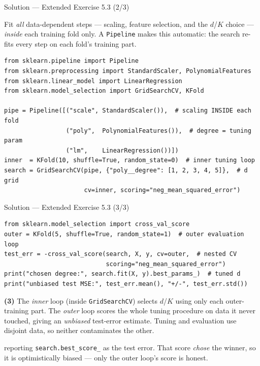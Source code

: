 \documentclass[aspectratio=169,11pt]{beamer}
\begin{document}
\begin{frame}[fragile]{Solution --- Extended Exercise 5.3 (2/3)}
  \begin{solutionbox}
    Fit \emph{all} data-dependent steps --- scaling, feature selection,
    and the $d$/$K$ choice --- \emph{inside} each training fold only. A
    \texttt{Pipeline} makes this automatic: the search re-fits every step
    on each fold's training part.
  \end{solutionbox}
  \begin{lstlisting}
from sklearn.pipeline import Pipeline
from sklearn.preprocessing import StandardScaler, PolynomialFeatures
from sklearn.linear_model import LinearRegression
from sklearn.model_selection import GridSearchCV, KFold

pipe = Pipeline([("scale", StandardScaler()),  # scaling INSIDE each fold
                 ("poly",  PolynomialFeatures()),  # degree = tuning param
                 ("lm",    LinearRegression())])
inner  = KFold(10, shuffle=True, random_state=0)  # inner tuning loop
search = GridSearchCV(pipe, {"poly__degree": [1, 2, 3, 4, 5]},  # d grid
                      cv=inner, scoring="neg_mean_squared_error")
  \end{lstlisting}
\end{frame}

\begin{frame}[fragile]{Solution --- Extended Exercise 5.3 (3/3)}
  \begin{lstlisting}
from sklearn.model_selection import cross_val_score
outer = KFold(5, shuffle=True, random_state=1)  # outer evaluation loop
test_err = -cross_val_score(search, X, y, cv=outer,  # nested CV
                            scoring="neg_mean_squared_error")
print("chosen degree:", search.fit(X, y).best_params_)  # tuned d
print("unbiased test MSE:", test_err.mean(), "+/-", test_err.std())
  \end{lstlisting}
  \begin{solutionbox}
    \textbf{(3)} The \emph{inner} loop (inside \texttt{GridSearchCV})
    selects $d$/$K$ using only each outer-training part. The \emph{outer}
    loop scores the whole tuning procedure on data it never touched,
    giving an \emph{unbiased} test-error estimate. Tuning and evaluation
    use disjoint data, so neither contaminates the other.
  \end{solutionbox}
  \begin{mistake}
    reporting \texttt{search.best\_score\_} as
    the test error. That score \emph{chose} the winner, so it is
    optimistically biased --- only the outer loop's score is honest.
  \end{mistake}
\end{frame}
\end{document}
